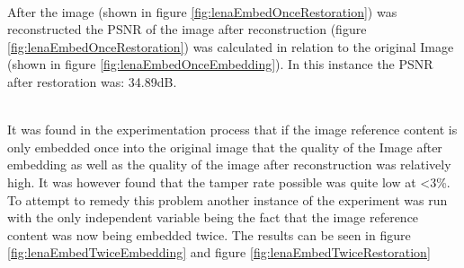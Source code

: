 \documentclass[12pt]{article}
\begin{document}
\hspace{0pt} \\
After the image (shown in figure \ref{fig:lenaEmbedOnceRestoration}) was reconstructed the PSNR of the image after reconstruction (figure \ref{fig:lenaEmbedOnceRestoration}) was calculated in relation to the original Image (shown in figure \ref{fig:lenaEmbedOnceEmbedding}).
In this instance the PSNR after restoration was: 34.89dB.

\hspace{0pt} \\
It was found in the experimentation process that if the image reference content is only embedded once into the original image that the quality of the Image after embedding as well as the quality of the image after reconstruction was relatively high.
It was however found that the tamper rate possible was quite low at \textless 3\%.
To attempt to remedy this problem another instance of the experiment was run with the only independent variable being the fact that the image reference content was now being embedded twice.
The results can be seen in figure \ref{fig:lenaEmbedTwiceEmbedding} and figure \ref{fig:lenaEmbedTwiceRestoration}
\end{document}
